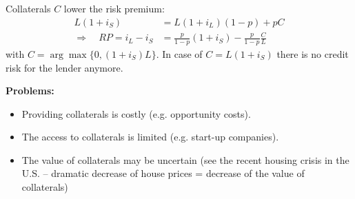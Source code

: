 \documentclass[11pt]{beamer}
\begin{document}
\begin{frame}
\frametitle{\insertsection}

Collaterals $C$ lower the risk premium:
\begin{align}
L(1+i_S) &=L(1+i_L)(1-p)+pC\\
\Rightarrow\quad
RP=i_L-i_S &=\frac{p}{1-p}(1+i_S)-\frac{p}{1-p}\frac{C}{L}
\end{align}
with $C=\arg\max\{0,(1+i_S)L\}$. In case of $C=L(1+i_S)$ there is no credit risk for the lender anymore.
\par\medskip

\textbf{Problems:}
\begin{itemize}
\item Providing collaterals is costly (e.g. opportunity costs).
\item The access to collaterals is limited (e.g. start-up companies).
\item The value of collaterals may be uncertain (see the recent housing crisis in the U.S. -- dramatic decrease of house prices = decrease of the value of collaterals)
\end{itemize}
\end{frame}
\end{document}
